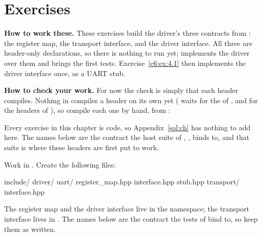 
\section{Exercises}
\label{c6:sec:exercises}\label{c6:app:b}

\begin{aside}
\textbf{How to work these.} These exercises build the driver's three contracts from
: the register map, the transport interface, and the driver interface.
All three are header-only declarations, so there is nothing to run yet;  implements the
driver over them and  brings the first tests. Exercise~\ref{c6:ex:4.1} then implements
the driver interface once, as a UART stub.

\textbf{How to check your work.} For now the check is simply that each header compiles. Nothing in
 compiles a header on its own yet ( waits for the
 of , and  for the headers of ), so
compile each one by hand, from :


\noindent Every exercise in this chapter is code, so Appendix~\ref{sol:ch} has nothing to add here.
The names below are the contract the host suite of ,
, binds to, and that suite is where these headers are first put to
work.
\end{aside}

Work in . Create the following files:

\begin{console}
include/
    driver/
        uart/
            register_map.hpp
            interface.hpp
            stub.hpp
        transport/
            interface.hpp
\end{console}

The register map and the driver interface live in the  namespace; the transport
interface lives in . The names below are the contract the tests of
 bind to, so keep them as written.

